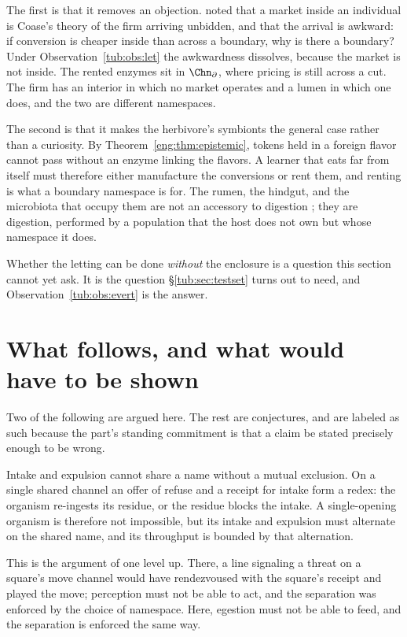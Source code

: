 The first is that it removes an objection. \chEng noted that a market inside an
individual is Coase's theory of the firm \cite{coase} arriving unbidden, and that
the arrival is awkward: if conversion is cheaper inside than across a boundary,
why is there a boundary? Under Observation~\ref{tub:obs:let} the awkwardness
dissolves, because the market is not inside. The rented enzymes sit in
$\Chn_{\partial}$, where pricing is still across a cut. The firm has an interior
in which no market operates and a lumen in which one does, and the two are
different namespaces.

The second is that it makes the herbivore's symbionts the general case rather
than a curiosity. By Theorem~\ref{eng:thm:epistemic}, tokens held in a foreign
flavor cannot pass without an enzyme linking the flavors. A learner that eats far
from itself must therefore either manufacture the conversions or rent them, and
renting is what a boundary namespace is for. The rumen, the hindgut, and the
microbiota that occupy them are not an accessory to digestion
\cite{karasov2013}; they are digestion, performed by a population that the host
does not own but whose namespace it does.

Whether the letting can be done \emph{without} the enclosure is a question this
section cannot yet ask. It is the question \S\ref{tub:sec:testset} turns out to
need, and Observation~\ref{tub:obs:evert} is the answer.

\section{What follows, and what would have to be shown}
\label{tub:sec:props}

Two of the following are argued here. The rest are conjectures, and are labeled
as such because the part's standing commitment is that a claim be stated
precisely enough to be wrong.

\begin{proposition}
\label{tub:prop:twoends}
Intake and expulsion cannot share a name without a mutual exclusion. On a single
shared channel an offer of refuse and a receipt for intake form a redex: the
organism re-ingests its residue, or the residue blocks the intake. A
single-opening organism is therefore not impossible, but its intake and
expulsion must alternate on the shared name, and its throughput is bounded by
that alternation.
\end{proposition}

This is the argument of \chGame one level up. There, a line signaling a threat on
a square's move channel would have rendezvoused with the square's receipt and
played the move; perception must not be able to act, and the separation was
enforced by the choice of namespace. Here, egestion must not be able to feed, and
the separation is enforced the same way.

